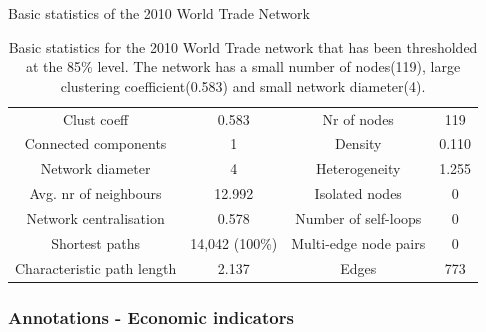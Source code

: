 \begin{table}
  \centering
  Basic statistics of the 2010 World Trade Network\\
  \begin{tabular}{  c  c | c  c }
    Clust coeff & 0.583 & Nr of nodes & 119\\
    Connected components & 1 & Density & 0.110\\
    Network diameter & 4 & Heterogeneity & 1.255\\
    Avg. nr of neighbours & 12.992 & Isolated nodes & 0\\
    Network centralisation & 0.578 & Number of self-loops & 0\\
    Shortest paths & 14,042 (100\%) & Multi-edge node pairs & 0\\
    Characteristic path length & 2.137 & Edges & 773 \\
  \end{tabular}
  \caption{Basic statistics for the 2010 World Trade network that has been thresholded at the 85\% level. The network has a small number of nodes(119), large clustering coefficient(0.583) and small network diameter(4).}
  \label{tab:trade_stats_table}
\end{table}

\subsubsection{Annotations - Economic indicators}

